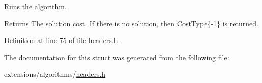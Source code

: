 Runs the algorithm. 

\begin{DoxyReturn}{Returns}
The solution cost. If there is no solution, then {\ttfamily Cost\+Type\{-\/1\}} is returned. 
\end{DoxyReturn}


Definition at line 75 of file headers.\+h.



The documentation for this struct was generated from the following file\+:\begin{DoxyCompactItemize}
\item 
extensions/algorithms/\hyperlink{extensions_2algorithms_2headers_8h}{headers.\+h}\end{DoxyCompactItemize}
